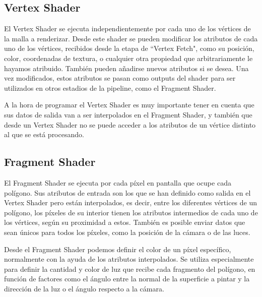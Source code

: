 \subsection{Vertex Shader}
El Vertex Shader se ejecuta independientemente por cada uno de los vértices de la malla a renderizar. Desde este shader se pueden modificar los atributos de cada uno de los vértices, recibidos desde la etapa de ``Vertex Fetch", como su posición, color, coordenadas de textura, o cualquier otra propiedad que arbitrariamente le hayamos atribuido. También pueden añadirse nuevos atributos si se desea. Una vez modificados, estos atributos se pasan como outputs del shader para ser utilizados en otros estadios de la pipeline, como el Fragment Shader.

A la hora de programar el Vertex Shader es muy importante tener en cuenta que sus datos de salida van a ser interpolados en el Fragment Shader, y también que desde un Vertex Shader no se puede acceder a los atributos de un vértice distinto al que se está procesando.

\subsection{Fragment Shader}
El Fragment Shader se ejecuta por cada píxel en pantalla que ocupe cada polígono. Sus atributos de entrada son los que se han definido como salida en el Vertex Shader pero están interpolados, es decir, entre los diferentes vértices de un polígono, los píxeles de su interior tienen los atributos intermedios de cada uno de los vértices, según su proximidad a estos. También es posible enviar datos que sean únicos para todos los píxeles, como la posición de la cámara o de las luces.

Desde el Fragment Shader podemos definir el color de un píxel específico, normalmente con la ayuda de los atributos interpolados. Se utiliza especialmente para definir la cantidad y color de luz que recibe cada fragmento del polígono, en función de factores como el ángulo entre la normal de la superficie a pintar y la dirección de la luz o el ángulo respecto a la cámara.